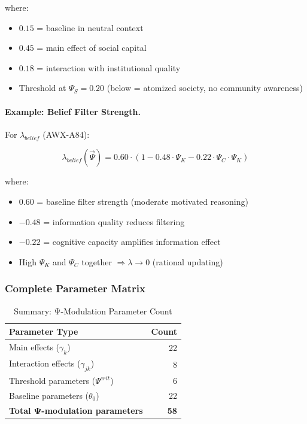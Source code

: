 where:
\begin{itemize}
    \item $0.15$ = baseline in neutral context
    \item $0.45$ = main effect of social capital
    \item $0.18$ = interaction with institutional quality
    \item Threshold at $\Psi_S = 0.20$ (below = atomized society, no community awareness)
\end{itemize}

\paragraph{Example: Belief Filter Strength.}
For $\lambda_{belief}$ (AWX-A84):

\begin{equation}
\lambda_{belief}(\vec{\Psi}) = 0.60 \cdot \left(1 - 0.48 \cdot \Psi_K - 0.22 \cdot \Psi_C \cdot \Psi_K \right)
\end{equation}

where:
\begin{itemize}
    \item $0.60$ = baseline filter strength (moderate motivated reasoning)
    \item $-0.48$ = information quality reduces filtering
    \item $-0.22$ = cognitive capacity amplifies information effect
    \item High $\Psi_K$ and $\Psi_C$ together $\Rightarrow \lambda \to 0$ (rational updating)
\end{itemize}

\subsubsection{Complete Parameter Matrix}

\begin{table}[htbp]
\centering
\caption{Summary: Ψ-Modulation Parameter Count}
\label{tab:psi-param-summary}
\begin{tabular}{lr}
\toprule
\textbf{Parameter Type} & \textbf{Count} \\
\midrule
Main effects ($\gamma_k$) & 22 \\
Interaction effects ($\gamma_{jk}$) & 8 \\
Threshold parameters ($\Psi^{crit}$) & 6 \\
Baseline parameters ($\theta_0$) & 22 \\
\midrule
\textbf{Total Ψ-modulation parameters} & \textbf{58} \\
\bottomrule
\end{tabular}
\end{table}

